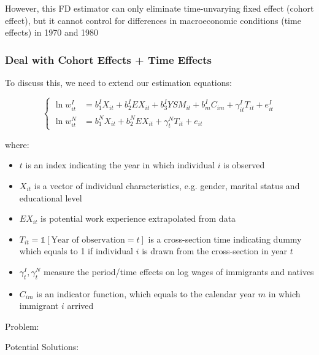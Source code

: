             However, this FD estimator can only eliminate time-unvarying fixed effect (cohort effect), but it cannot control for differences in macroeconomic conditions (time effects) in 1970 and 1980

        
        \subsubsection{Deal with Cohort Effects + Time Effects}

            To discuss this, we need to extend our estimation equations:

            \[
            \begin{cases}
            \ln w_{it}^I & = b_{1}^IX_{it} + b_{2}^IEX_{it} + b_{3}^IYSM_{it} + b_{m}^IC_{im} + \gamma_{it}^IT_{it} + e_{it}^I \\
            \ln w_{it}^N & = b_{1}^NX_{it} + b_{2}^NEX_{it} + \gamma_{t}^NT_{it} + e_{it}
            \end{cases}
            \]

            where:

            \begin{itemize}
                \item $t$ is an index indicating the year in which individual $i$ is observed
                \item $X_{it}$ is a vector of individual characteristics, e.g. gender, marital status and educational level
                \item $EX_{it}$ is potential work experience extrapolated from data
                \item $T_{it}=\mathds{1}[\text{Year of observation}=t]$ is a cross-section time indicating dummy which equals to 1 if individual $i$ is drawn from the cross-section in year $t$
                \item $\gamma_{t}^I,\gamma_{t}^N$ measure the period/time effects on log wages of immigrants and natives
                \item $C_{im}$ is an indicator function, which equals to the calendar year $m$ in which immigrant $i$ arrived
            \end{itemize}

            Problem: 

            Potential Solutions:

